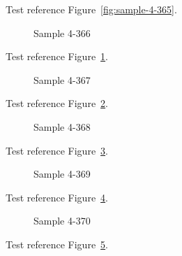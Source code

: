 Test reference Figure~\ref{fig:sample-4-365}.

\begin{figure}[tbhp]
\caption{Sample 4-366}
\label{fig:sample-4-366}
\end{figure}

Test reference Figure~\ref{fig:sample-4-366}.

\begin{figure}[tbhp]
\caption{Sample 4-367}
\label{fig:sample-4-367}
\end{figure}

Test reference Figure~\ref{fig:sample-4-367}.

\begin{figure}[tbhp]
\caption{Sample 4-368}
\label{fig:sample-4-368}
\end{figure}

Test reference Figure~\ref{fig:sample-4-368}.

\begin{figure}[tbhp]
\caption{Sample 4-369}
\label{fig:sample-4-369}
\end{figure}

Test reference Figure~\ref{fig:sample-4-369}.

\begin{figure}[tbhp]
\caption{Sample 4-370}
\label{fig:sample-4-370}
\end{figure}

Test reference Figure~\ref{fig:sample-4-370}.

